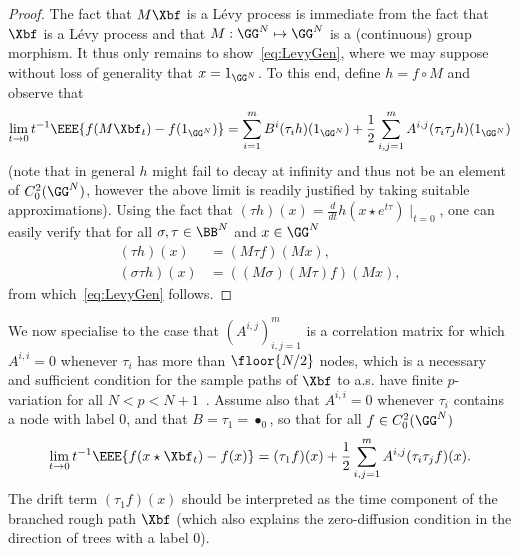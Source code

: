 \documentclass{article}
\begin{document}
\begin{proof}
The fact that $M\Xbf$ is a L{\'e}vy process is immediate from the fact that $\Xbf$ is a L{\'e}vy process and that $M : \GG^N \mapsto \GG^N$ is a (continuous) group morphism. It thus only remains to show~\eqref{eq:LevyGen}, where we may suppose without loss of generality that $x=1_{\GG^N}$. To this end, define $h = f\circ M$ and observe that
\[
\lim_{t \rightarrow 0} t^{-1}\EEE{f(M\Xbf_t) - f(1_{\GG^N})} = \sum_{i=1}^m B^i (\tau_i h)(1_{\GG^N}) + \frac{1}{2}\sum_{i,j=1}^m A^{i,j} (\tau_i\tau_j h)(1_{\GG^N})
\]
(note that in general $h$ might fail to decay at infinity and thus not be an element of $C^2_0(\GG^N)$, however the above limit is readily justified by taking suitable approximations). Using the fact that $(\tau h)(x) = \frac{d}{dt} h(x\star e^{t\tau})\mid_{t=0}$, one can easily verify that for all $\sigma,\tau \in \BB^N$ and $x \in \GG^N$
\begin{align*}
(\tau h)(x) &= (M\tau f)(Mx), \\
(\sigma \tau h)(x) &= ((M\sigma) (M \tau) f )(Mx),
\end{align*}
from which~\eqref{eq:LevyGen} follows.
%
\end{proof}

We now specialise to the case that $(A^{i,j})_{i,j=1}^m$ is a correlation matrix for which $A^{i,i} = 0$ whenever $\tau_i$ has more than $\floor{N/2}$ nodes, which is a necessary and sufficient condition for the sample paths of $\Xbf$ to a.s. have finite $p$-variation for all $N < p < N+1$~\cite{Chevyrev15}. Assume also that $A^{i,i} = 0$ whenever $\tau_i$ contains a node with label $0$, and that $B = \tau_1 = \bullet_0$, so that for all $f \in C^2_0(\GG^N)$
\[
\lim_{t \rightarrow 0} t^{-1}\EEE{f(x\star\Xbf_t) - f(x)} = (\tau_1 f) (x) + \frac{1}{2}\sum_{i,j=1}^m A^{i,j} (\tau_i\tau_j f)(x).
\]
The drift term $(\tau_1 f) (x)$ should be interpreted as the time component of the branched rough path $\Xbf$ (which also explains the zero-diffusion condition in  the direction of trees with a label $0$).
\end{document}
